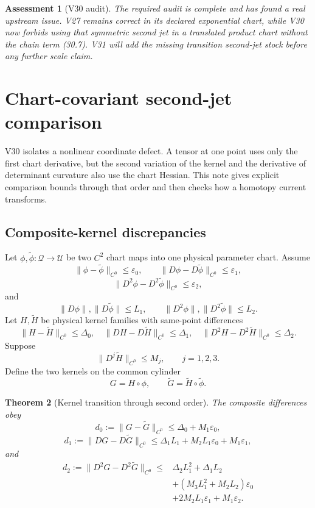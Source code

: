\documentclass[11pt]{article}
\newtheorem{theorem}{Theorem}[section]
\newtheorem{assessment}[theorem]{Assessment}
\begin{document}
\begin{assessment}[V30 audit]
\label{ass:v11v30}
The required audit is complete and has found a real upstream issue.
V27 remains correct in its declared exponential chart, while V30 now
forbids using that symmetric second jet in a translated product chart
without the chain term (30.7).  V31 will add the missing transition
second-jet stock before any further scale claim.
\end{assessment}
\section{Chart-covariant second-jet comparison}
\label{sec:v11v31}

V30 isolates a nonlinear coordinate defect.  A tensor at one point uses
only the first chart derivative, but the second variation of the kernel
and the derivative of determinant curvature also use the chart Hessian.
This note gives explicit comparison bounds through that order and then
checks how a homotopy current transforms.

\subsection{Composite-kernel discrepancies}

Let \(\phi,\widetilde\phi:\mathcal Q\to\mathcal U\) be two \(C^2\)
chart maps into one physical parameter chart.  Assume
\[
 \|\phi-\widetilde\phi\|_{C^0}\leq\varepsilon_0,\qquad
 \|D\phi-D\widetilde\phi\|_{C^0}\leq\varepsilon_1,
 \tag{31.1}
\]
\[
 \|D^2\phi-D^2\widetilde\phi\|_{C^0}
 \leq\varepsilon_2,
 \tag{31.2}
\]
and
\[
 \|D\phi\|,\|D\widetilde\phi\|\leq L_1,\qquad
 \|D^2\phi\|,\|D^2\widetilde\phi\|\leq L_2.
 \tag{31.3}
\]
Let \(H,\widetilde H\) be physical kernel families with same-point
differences
\[
 \|H-\widetilde H\|_{C^0}\leq\Delta_0,\quad
 \|DH-D\widetilde H\|_{C^0}\leq\Delta_1,\quad
 \|D^2H-D^2\widetilde H\|_{C^0}\leq\Delta_2.
 \tag{31.4}
\]
Suppose
\[
 \|D^j\widetilde H\|_{C^0}\leq M_j,\qquad j=1,2,3.
 \tag{31.5}
\]
Define the two kernels on the common cylinder
\[
 G=H\circ\phi,\qquad
 \widetilde G=\widetilde H\circ\widetilde\phi.
 \tag{31.6}
\]

\begin{theorem}[Kernel transition through second order]
\label{thm:v11v31-kernel-transition}
The composite differences obey
\[
 d_0:=\|G-\widetilde G\|_{C^0}
 \leq
 \Delta_0+M_1\varepsilon_0,
 \tag{31.7}
\]
\[
 d_1:=\|DG-D\widetilde G\|_{C^0}
 \leq
 \Delta_1L_1+M_2L_1\varepsilon_0+M_1\varepsilon_1,
 \tag{31.8}
\]
and
\[
 \begin{split}
 d_2:=\|D^2G-D^2\widetilde G\|_{C^0}
 \leq{}&
 \Delta_2L_1^2+\Delta_1L_2\\
 &+(M_3L_1^2+M_2L_2)\varepsilon_0\\
 &+2M_2L_1\varepsilon_1+M_1\varepsilon_2.
 \end{split}
 \tag{31.9}
\]
\end{theorem}
\end{document}
